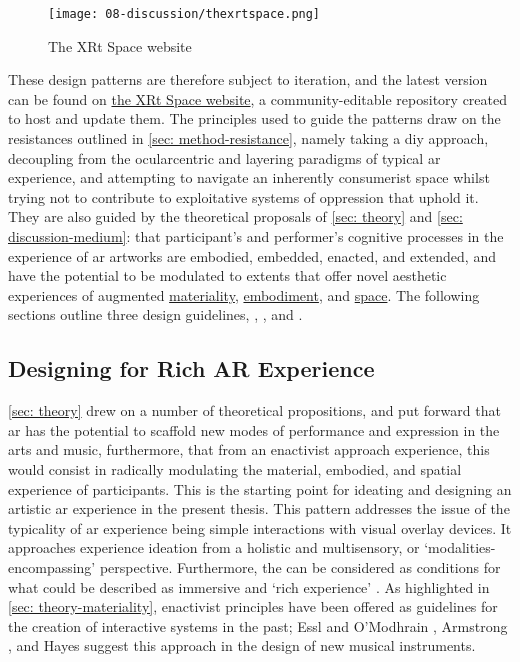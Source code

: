\begin{figure}
    \centering
    {\texttt{[image: 08-discussion/thexrtspace.png]}}
    \caption[The XRt Space website]{The XRt Space website}
\end{figure}\label{fig: thexrtspace}

These design patterns are therefore subject to iteration, and the latest version can be found on \href{https://sambilbow.github.io/thexrtspace}{the XRt Space website}, a community-editable repository created to host and update them. The principles used to guide the patterns draw on the resistances outlined in \autoref{sec: method-resistance}, namely taking a \gls{diy} approach, decoupling from the ocularcentric and layering paradigms of typical \gls{ar} experience, and attempting to navigate an inherently consumerist space whilst trying not to contribute to exploitative systems of oppression that uphold it. They are also guided by the theoretical proposals of \autoref{sec: theory} and \autoref{sec: discussion-medium}: that participant's and performer's cognitive processes in the experience of \gls{ar} artworks are embodied, embedded, enacted, and extended, and have the potential to be modulated to extents that offer novel aesthetic experiences of augmented \hyperref[sec: discussion-medium-material]{materiality}, \hyperref[sec: discussion-medium-embodiment]{embodiment}, and \hyperref[sec: discussion-medium-space]{space}. The following sections outline three design guidelines, \textit{}, \textit{}, and \textit{}.

\subsection{Designing for Rich AR Experience}\label{sec: discussion-guidelines-experience} 
\autoref{sec: theory} drew on a number of theoretical propositions, and put forward that \gls{ar} has the potential to scaffold new modes of performance and expression in the arts and music, furthermore, that from an enactivist approach experience, this would consist in radically modulating the material, embodied, and spatial experience of participants. This is the starting point for ideating and designing an artistic \gls{ar} experience in the present thesis. This pattern addresses the issue of the typicality of \gls{ar} experience being simple interactions with visual overlay devices. It approaches experience ideation from a holistic and multisensory, or `modalities-encompassing' \citep{schraffenberger2018} perspective. Furthermore, the  can be considered as conditions for what could be described as immersive and `rich experience' \citep{bilbow2021}. As highlighted in \autoref{sec: theory-materiality}, enactivist principles have been offered as guidelines for the creation of interactive systems in the past; Essl and O'Modhrain \citeyearpar{essl2006}, Armstrong \citeyearpar{armstrong2006}, and Hayes \citeyearpar{hayes2019} suggest this approach in the design of new musical instruments. 


